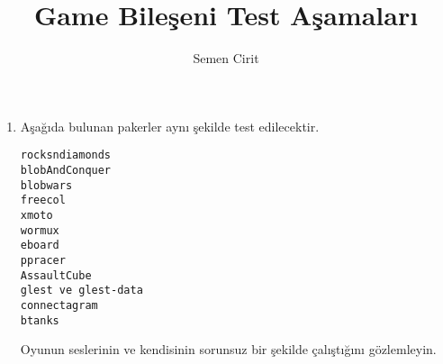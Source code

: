 \documentclass[a4paper,10pt]{article}
\title{Game Bileşeni Test Aşamaları}
\author{Semen Cirit}
\begin{document}
\maketitle

\begin{enumerate}
\item Aşağıda bulunan pakerler aynı şekilde test edilecektir. 
\begin{verbatim}
rocksndiamonds 
blobAndConquer
blobwars
freecol
xmoto
wormux
eboard
ppracer
AssaultCube
glest ve glest-data
connectagram
btanks
\end{verbatim}

Oyunun seslerinin ve kendisinin sorunsuz bir şekilde çalıştığını gözlemleyin.	
\end{enumerate}
\end{document}
